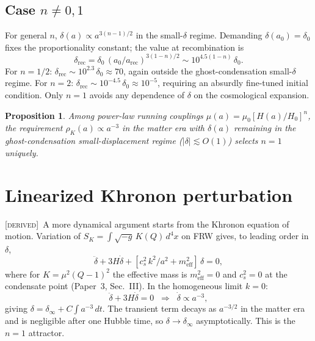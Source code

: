 \documentclass[prd,twocolumn,superscriptaddress,longbibliography,floatfix]{revtex4-2}
\newtheorem{proposition}[theorem]{Proposition}
\newcommand{\Hzero}{H_{0}}
\newcommand{\muzero}{\mu_{0}}
\newcommand{\derived}{\textsc{[derived]}}
\begin{document}
\subsection{Case $n \neq 0, 1$}

For general $n$, $\delta(a) \propto a^{3(n-1)/2}$ in
the small-$\delta$ regime.  Demanding
$\delta(a_{0}) = \delta_{0}$ fixes the proportionality
constant; the value at recombination is
\begin{equation}
\delta_{\mathrm{rec}}
= \delta_{0}\,(a_{0}/a_{\mathrm{rec}})^{3(1-n)/2}
\sim 10^{4.5(1-n)}\,\delta_{0}.
\label{eq:delta_rec}
\end{equation}
For $n = 1/2$: $\delta_{\mathrm{rec}} \sim 10^{2.3}\,\delta_{0}
\approx 70$, again outside the ghost-condensation
small-$\delta$ regime.  For $n = 2$:
$\delta_{\mathrm{rec}} \sim 10^{-4.5}\,\delta_{0}
\approx 10^{-5}$, requiring an absurdly fine-tuned
initial condition.  Only $n = 1$ avoids any
dependence of $\delta$ on the cosmological expansion.

\begin{proposition}
\label{prop:n1}
Among power-law running couplings
$\mu(a) = \muzero[H(a)/\Hzero]^{n}$, the requirement
$\rho_{K}(a) \propto a^{-3}$ in the matter era with
$\delta(a)$ remaining in the ghost-condensation
small-displacement regime
($|\delta| \lesssim O(1)$) selects $n = 1$ uniquely.
\end{proposition}

\section{Linearized Khronon perturbation}
\label{sec:perturbation}

\derived\ A more dynamical argument starts from the
Khronon equation of motion.  Variation of
$S_{K} = \int \sqrt{-g}\,K(Q)\,d^{4}x$ on FRW gives,
to leading order in $\delta$,
\begin{equation}
\ddot{\delta} + 3H\dot{\delta} +
[c_{s}^{2}\,k^{2}/a^{2} + m_{\mathrm{eff}}^{2}]\,\delta
= 0,
\label{eq:KG}
\end{equation}
where for $K = \mu^{2}(Q-1)^{2}$ the effective mass is
$m_{\mathrm{eff}}^{2} = 0$ and $c_{s}^{2} = 0$ at the
condensate point (Paper~3, Sec.~III).  In the
homogeneous limit $k = 0$:
\begin{equation}
\ddot{\delta} + 3H\dot{\delta} = 0
\;\;\Longrightarrow\;\; \dot{\delta} \propto a^{-3},
\label{eq:Hubble_friction}
\end{equation}
giving $\delta = \delta_{\infty} + C\int a^{-3}\,dt$.
The transient term decays as $a^{-3/2}$ in the matter
era and is negligible after one Hubble time, so
$\delta \to \delta_{\infty}$ asymptotically.  This is
the $n = 1$ attractor.
\end{document}
